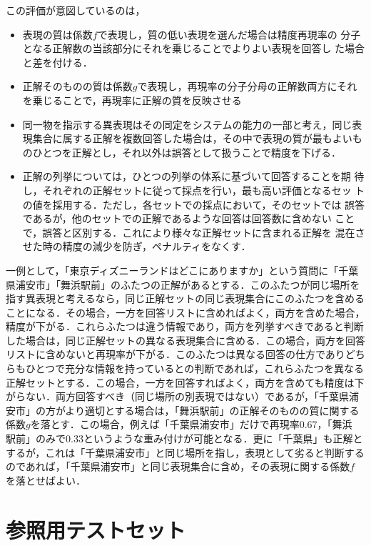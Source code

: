 \documentclass[japanese]{jnlp_1.4}
\begin{document}
この評価が意図しているのは，
\begin{itemize}
\item 表現の質は係数$f$で表現し，質の低い表現を選んだ場合は精度再現率の
      分子となる正解数の当該部分にそれを乗じることでよりよい表現を回答し
      た場合と差を付ける．
\item 正解そのものの質は係数$g$で表現し，再現率の分子分母の正解数両方にそれを乗じることで，再現率に正解の質を反映させる
\item 同一物を指示する異表現はその同定をシステムの能力の一部と考え，同じ表現集合に属する正解を複数回答した場合は，その中で表現の質が最もよいものひとつを正解とし，それ以外は誤答として扱うことで精度を下げる．
\item 正解の列挙については，ひとつの列挙の体系に基づいて回答することを期
      待し，それぞれの正解セットに従って採点を行い，最も高い評価となるセッ
      トの値を採用する．ただし，各セットでの採点において，そのセットでは
      誤答であるが，他のセットでの正解であるような回答は回答数に含めない
      ことで，誤答と区別する．これにより様々な正解セットに含まれる正解を
      混在させた時の精度の減少を防ぎ，ペナルティをなくす．
\end{itemize}

一例として，「東京ディズニーランドはどこにありますか」という質問に「千葉
県浦安市」「舞浜駅前」のふたつの正解があるとする．このふたつが同じ場所を
指す異表現と考えるなら，同じ正解セットの同じ表現集合にこのふたつを含める
ことになる．その場合，一方を回答リストに含めればよく，両方を含めた場合，
精度が下がる．これらふたつは違う情報であり，両方を列挙すべきであると判断
した場合は，同じ正解セットの異なる表現集合に含める．この場合，両方を回答
リストに含めないと再現率が下がる．このふたつは異なる回答の仕方でありどち
らもひとつで充分な情報を持っているとの判断であれば，これらふたつを異なる
正解セットとする．この場合，一方を回答すればよく，両方を含めても精度は下
がらない．両方回答すべき（同じ場所の別表現ではない）であるが，「千葉県浦
安市」の方がより適切とする場合は，「舞浜駅前」の正解そのものの質に関する
係数$g$を落とす．この場合，例えば「千葉県浦安市」だけで再現率0.67，「舞浜
駅前」のみで0.33というような重み付けが可能となる．更に「千葉県」も正解と
するが，これは「千葉県浦安市」と同じ場所を指し，表現として劣ると判断する
のであれば，「千葉県浦安市」と同じ表現集合に含め，その表現に関する係数$f$
を落とせばよい．



\section{参照用テストセット} \label{Sec4}
\end{document}
